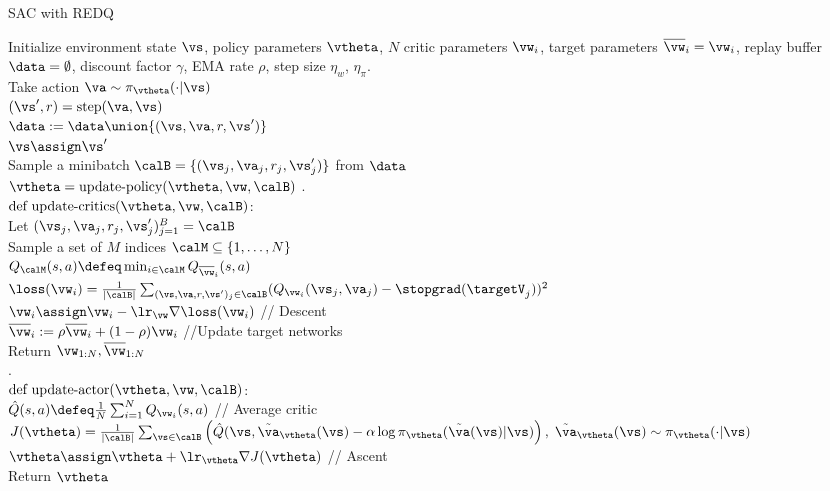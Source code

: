 {\begin{algorithm}
\dontprintsemicolon
\caption{SAC with REDQ}
\label{algo:SACREDQ}
Initialize environment state $\vs$,
policy parameters $\vtheta$,
$N$ critic parameters $\vw_i$,
target parameters $\overline{\vw}_i = \vw_i$,
replay buffer $\data=\emptyset$,
discount factor $\gamma$,
EMA rate $\rho$,
step size $\eta_w$, $\eta_\pi$.
\\
       {
         Take action $\va \sim \pi_{\vtheta}(\cdot|\vs)$ \\
         $(\vs',r) = \text{step}(\va, \vs)$ \\
         $\data := \data \union
         \{ (\vs, \va, r, \vs') \}$ \\
         $\vs \assign \vs'$ \\
         Sample a minibatch $\calB = \{(\vs_j,\va_j,r_j,\vs'_j)\}$
         from $\data$\\
         $\vtheta = \text{update-policy}(\vtheta,\vw, \calB)$
        }
.\\
$\text{def update-critics}(\vtheta,\vw,\calB)$: \\
       Let $(\vs_j,\va_j,r_j,\vs'_j)_{j=1}^B = \calB$ \\
Sample a set of $M$ indices $\calM \subseteq \{1,\ldots,N\}$ \\
$Q_{\calM}(s,a)  \defeq \min_{i \in \calM} Q_{\overline{\vw}_i}(s,a)$ \\
    {
      $\loss(\vw_i) = \frac{1}{|\calB|} \sum_{(\vs,\va,r,\vs')_j \in
        \calB} (Q_{\vw_i}(\vs_j,\va_j) - \stopgrad(\targetV_j))^2$\\
      $\vw_i \assign \vw_i - \lr_{\vw} \nabla \loss(\vw_i)$ // Descent
      \\
      $\overline{\vw}_i := \rho \overline{\vw}_i
      + (1-\rho) \vw_i$       //Update target networks \\
    }
    Return $\vw_{1:N}, \overline{\vw}_{1:N}$\\
.\\
$\text{def update-actor}(\vtheta,\vw,\calB)$: \\
    $\hat{Q}(s,a)  \defeq \frac{1}{N} \sum_{i=1}^N
    Q_{\vw_i}(s,a)$ // Average critic\\
$J(\vtheta) =
\frac{1}{|\calB|} \sum_{\vs \in \calB}
\left(
\hat{Q}(\vs, \tilde{\va}_{\vtheta}(\vs)
-
\alpha \log \pi_{\vtheta}(\tilde{\va}(\vs)|\vs)
\right),
\;  \tilde{\va}_{\vtheta}(\vs) \sim \pi_{\vtheta}(\cdot|\vs)
$ \\
$\vtheta \assign \vtheta +  \lr_{\vtheta} \nabla J(\vtheta)$ // Ascent\\
Return $\vtheta$
\end{algorithm}
}


